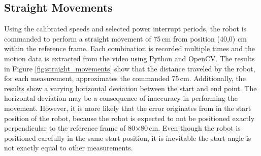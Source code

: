 \subsection{Straight Movements}
\label{eval:straight_movements}

Using the calibrated speeds and selected power interrupt periods, the robot is commanded to perform a straight movement of 75\,cm from position (40,0) cm within the reference frame.
Each combination is recorded multiple times and the motion data is extracted from the video using Python and OpenCV.
The results in Figure \ref{fig:straight_movements} show that the distance traveled by the robot, for each measurement, approximates the commanded 75\,cm.
Additionally, the results show a varying horizontal deviation between the start and end point.
The horizontal deviation may be a consequence of inaccuracy in performing the movement.
However, it is more likely that the error originates from in the start position of the robot, because the robot is expected to not be positioned exactly perpendicular to the reference frame of 80$\times$80\,cm.
Even though the robot is positioned carefully in the same start position, it is inevitable the start angle is not exactly equal to other measurements.

